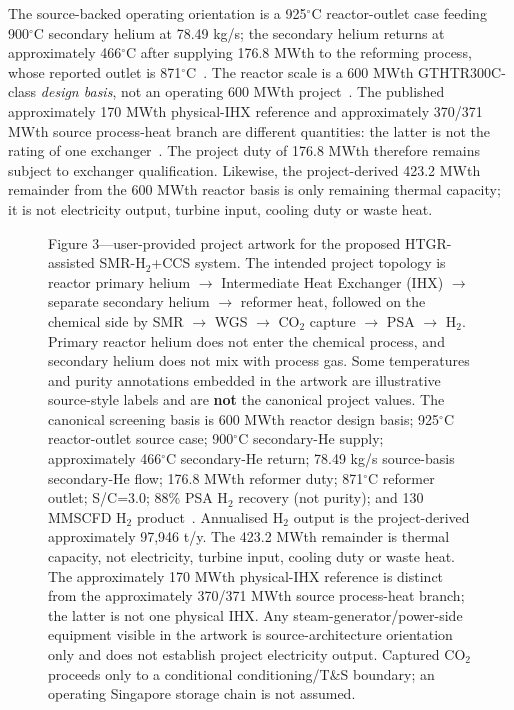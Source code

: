 The source-backed operating orientation is a 925$^\circ$C reactor-outlet case feeding 900$^\circ$C secondary helium at 78.49 kg/s; the secondary helium returns at approximately 466$^\circ$C after supplying 176.8 MWth to the reforming process, whose reported outlet is 871$^\circ$C~\cite{inltev953,inltev961}. The reactor scale is a 600 MWth GTHTR300C-class \emph{design basis}, not an operating 600 MWth project~\cite{jaeri2004gthtr300c,nishihara2007potential}. The published approximately 170 MWth physical-IHX reference and approximately 370/371 MWth source process-heat branch are different quantities: the latter is not the rating of one exchanger~\cite{jaeri2004gthtr300c,nishihara2007potential}. The project duty of 176.8 MWth therefore remains subject to exchanger qualification. Likewise, the project-derived 423.2 MWth remainder from the 600 MWth reactor basis is only remaining thermal capacity; it is not electricity output, turbine input, cooling duty or waste heat.

\begin{figure}[p]\centering
{}
\caption{Figure 3---user-provided project artwork for the proposed HTGR-assisted SMR-H$_2$+CCS system. The intended project topology is reactor primary helium $\rightarrow$ Intermediate Heat Exchanger (IHX) $\rightarrow$ separate secondary helium $\rightarrow$ reformer heat, followed on the chemical side by SMR $\rightarrow$ WGS $\rightarrow$ CO$_2$ capture $\rightarrow$ PSA $\rightarrow$ H$_2$. Primary reactor helium does not enter the chemical process, and secondary helium does not mix with process gas. Some temperatures and purity annotations embedded in the artwork are illustrative source-style labels and are \textbf{not} the canonical project values. The canonical screening basis is 600 MWth reactor design basis; 925$^\circ$C reactor-outlet source case; 900$^\circ$C secondary-He supply; approximately 466$^\circ$C secondary-He return; 78.49 kg/s source-basis secondary-He flow; 176.8 MWth reformer duty; 871$^\circ$C reformer outlet; S/C=3.0; 88\% PSA H$_2$ recovery (not purity); and 130 MMSCFD H$_2$ product~\cite{inltev953,inltev961,jaeri2004gthtr300c,nishihara2007potential}. Annualised H$_2$ output is the project-derived approximately 97,946 t/y. The 423.2 MWth remainder is thermal capacity, not electricity, turbine input, cooling duty or waste heat. The approximately 170 MWth physical-IHX reference is distinct from the approximately 370/371 MWth source process-heat branch; the latter is not one physical IHX. Any steam-generator/power-side equipment visible in the artwork is source-architecture orientation only and does not establish project electricity output. Captured CO$_2$ proceeds only to a conditional conditioning/T\&S boundary; an operating Singapore storage chain is not assumed.}
\label{fig:proposed-orientation}
\end{figure}

